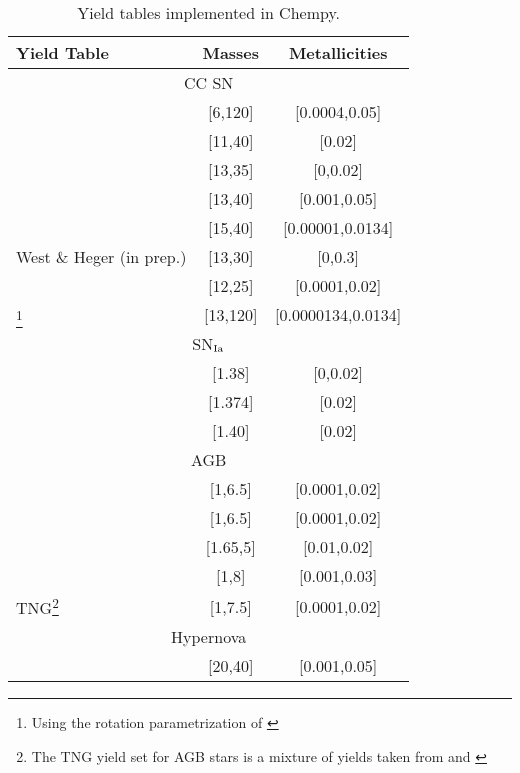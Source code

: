 \documentclass[useAMS,usenatbib]{mnras}
\newcommand{\Msun}{{\ifmmode{{\rm M}_{\odot}}\else{${\rm M}_{\odot}$}\fi}}
\def \Msun {\ifmmode {\rm M}_{\odot} \else ${\rm M}_{\odot}$ \fi}
\begin{document}
\begin{table}
\label{tab:props}
\begin{center}
\caption{Yield tables implemented in Chempy.}
\begin{minipage}{.5\textwidth}
\begin{tabular}{l c c }
		\hline\hline
		Yield Table & Masses & Metallicities \\
		\hline
		\multicolumn{3}{c}{CC SN}\\
		\hline
		\citet{Portinari1998} & [6,120] & [0.0004,0.05] \\
		\citet{Francois2004} & [11,40] & [0.02] \\
		\citet{Chieffi2004} & [13,35] & [0,0.02] \\
		\citet{Nomoto2013} & [13,40] & [0.001,0.05] \\
		\citet{Frischknecht2016} & [15,40] & [0.00001,0.0134] \\
		West \& Heger (in prep.) & [13,30] & [0,0.3] \\
		\citet{Ritter2018} & [12,25] & [0.0001,0.02] \\
		\citet{Limongi2018}\footnote{Using the rotation parametrization of \citet{Prantzos2018}} & [13,120] & [0.0000134,0.0134] \\
		\hline
		\multicolumn{3}{c}{SN$_{\rm Ia}$}\\
		\hline
		\citet{Iwamoto1999} & [1.38] & [0,0.02] \\
		\citet{Thielemann2003} & [1.374] & [0.02] \\
		\citet{Seitenzahl2013} & [1.40] & [0.02] \\
		\hline
		\multicolumn{3}{c}{AGB}\\
		\hline
		\citet{Karakas2010} & [1,6.5] & [0.0001,0.02] \\
		\citet{Ventura2013} & [1,6.5] & [0.0001,0.02] \\
		\citet{Pignatari2016} & [1.65,5] & [0.01,0.02] \\
		\citet{Karakas2016} & [1,8] & [0.001,0.03] \\
		TNG\footnote{The TNG yield set for AGB stars is a mixture of yields taken from \citet{Karakas2010,Doherty2014} and \citet{Fishlock2014}} & [1,7.5] & [0.0001,0.02] \\
		\hline
		\multicolumn{3}{c}{Hypernova}\\
		\hline
		\citet{Nomoto2013} & [20,40] & [0.001,0.05] \\
        \hline
\end{tabular}
\end{minipage}
\end{center}
\end{table}
\end{document}
